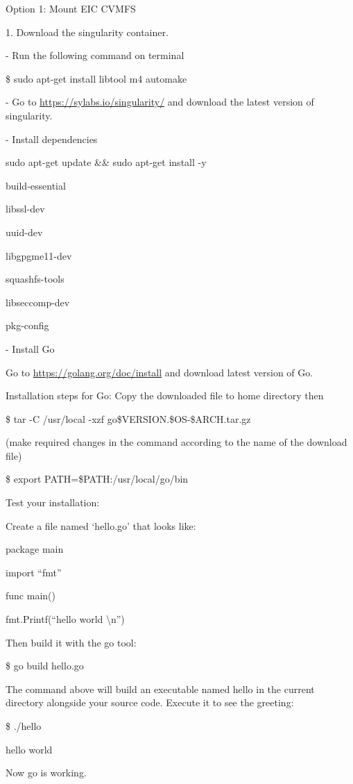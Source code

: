 Option 1: Mount EIC CVMFS


1. Download the singularity container.

- Run the following command on terminal

\$ sudo apt-get install libtool m4 automake

- Go to \href{https://sylabs.io/singularity/}{https://sylabs.io/singularity/} and download the latest version of singularity.

- Install dependencies

sudo apt-get update \&\& sudo apt-get install -y \

    build-essential \
    
    libssl-dev \
    
    uuid-dev \
    
    libgpgme11-dev \
    
    squashfs-tools \
    
    libseccomp-dev \
    
    pkg-config
    
- Install Go

Go to \href{https://golang.org/doc/install}{https://golang.org/doc/install} and download latest version of Go.

Installation steps for Go: Copy the downloaded file to home directory then

\$ tar -C /usr/local -xzf go\$VERSION.\$OS-\$ARCH.tar.gz

(make required changes in the command according to the name of the download file)

\$ export PATH=\$PATH:/usr/local/go/bin

Test your installation:

Create a file named ‘hello.go’ that looks like:

	package main
	
	import “fmt”

	func main() {
	
fmt.Printf(“hello world \textbackslash n”)

}

Then build it with the go tool:

\$ go build hello.go

The command above will build an executable named hello in the current directory alongside your source code. Execute it to see the greeting:

\$ ./hello

hello world

Now go is working.


